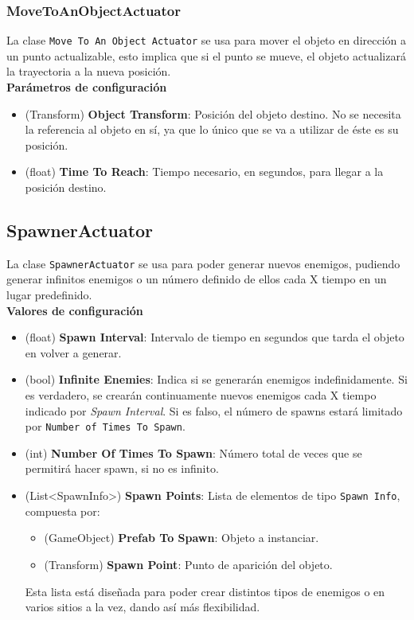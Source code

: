 \subsubsection{MoveToAnObjectActuator}
La clase \texttt{Move To An Object Actuator} se usa para mover el objeto en dirección a un punto actualizable, esto implica que si el punto se mueve, el objeto actualizará la trayectoria a la nueva posición.\\

\textbf{Parámetros de configuración}
\begin{itemize} 
	\item (Transform) \textbf{Object Transform}: Posición del objeto destino. No se necesita la referencia al objeto en sí, ya que lo único que se va a utilizar de éste es su posición.
	\item (float) \textbf{Time To Reach}: Tiempo necesario, en segundos, para llegar a la posición destino.
\end{itemize}

\subsection{SpawnerActuator}
La clase \texttt{SpawnerActuator} se usa para poder generar nuevos enemigos, pudiendo generar infinitos enemigos o un número definido de ellos cada X tiempo en un lugar predefinido.\\

\textbf{Valores de configuración}
\begin{itemize}
    \item (float) \textbf{Spawn Interval}: Intervalo de tiempo en segundos que tarda el objeto en volver a generar. 
    \item (bool) \textbf{Infinite Enemies}: Indica si se generarán enemigos indefinidamente. Si es verdadero, se crearán continuamente nuevos enemigos cada X tiempo indicado por \textit{Spawn Interval}. Si es falso, el número de spawns estará limitado por \texttt{Number of Times To Spawn}.
    \item (int) \textbf{Number Of Times To Spawn}: Número total de veces que se permitirá hacer spawn, si no es infinito.
    \item (List<SpawnInfo>) \textbf{Spawn Points}: Lista de elementos de tipo \texttt{Spawn Info}, compuesta por:
    \begin{itemize} 
	\item (GameObject) \textbf{Prefab To Spawn}: Objeto a instanciar.
	\item (Transform) \textbf{Spawn Point}: Punto de aparición del objeto.
    \end{itemize}
    Esta lista está diseñada para poder crear distintos tipos de enemigos o en varios sitios a la vez, dando así más flexibilidad.
\end{itemize}


